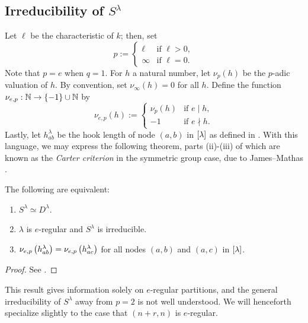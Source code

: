 \documentclass{amsart}
\begin{document}
  \subsection{Irreducibility of $S^\lambda$}
  Let $\ell$ be the characteristic of $k$;
  then, set
  \[
    p := \begin{cases}
      \ell & \text{if }\ell > 0,\\
      \infty & \text{if }\ell = 0.
    \end{cases}
  \]
  Note that $p = e$ when $q = 1$.
  For $h$ a natural number, let $\nu_p(h)$ be the $p$-adic valuation of $h$.
  By convention, set $\nu_\infty(h) = 0$ for all $h$.
  Define the function $\nu_{e,p} : \mathbb{N} \rightarrow \left\{ -1 \right\} \cup \mathbb{N}$ by
  \[
    \nu_{e,p}(h) := \begin{cases}
      \nu_p(h) & \text{if }e \mid h,\\
      -1 & \text{if }e \nmid h.
    \end{cases}
  \]
  Lastly, let $h_{ab}^\lambda$ be the hook length of node $(a,b)$ in $\left[ \lambda \right]$ as defined in \cite{Kleshchev}.
  With this language, we may express the following theorem, parts (ii)-(iii) of which are known as the \emph{Carter criterion} in the symmetric group case, due to James--Mathas \cite{Mathas-book}.
  \begin{theorem}\label{Mathas Irreducibility}
    The following are equivalent:
    \begin{enumerate}[label={(\roman*)}]
      \item $S^{\lambda} \simeq D^{\lambda}$.
      \item $\lambda$ is $e$-regular and $S^\lambda$ is irreducible.
      \item $\nu_{e,p}\left( h_{ab}^\lambda \right) = \nu_{e,p}\left( h_{ac}^\lambda \right)$ for all nodes $(a,b)$ and $(a,c)$ in $\left[ \lambda \right]$.
    \end{enumerate}
  \end{theorem}
  \begin{proof}
    See \cite[Thm~5.42]{Mathas-book}.
  \end{proof}
  This result gives information solely on $e$-regular partitions, and the general irreducibility of $S^\lambda$ away from $p=2$ is not well understood.
  We will henceforth specialize slightly to the case that $(n+r,n)$ is $e$-regular. 
\end{document}
